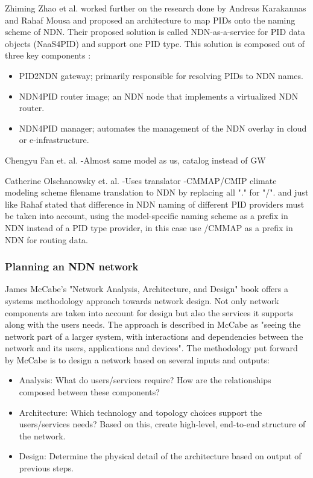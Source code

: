 Zhiming Zhao et al. worked further on the research done by Andreas Karakannas and Rahaf Mousa and proposed an architecture to map PIDs onto the naming scheme of NDN. Their proposed solution is called NDN-as-a-service for PID data objects (NaaS4PID) and support one PID type. This solution is composed out of three key components \cite{icn-resteam}:
\begin{itemize}
  \item PID2NDN gateway; primarily responsible for resolving PIDs to NDN names.
  \item NDN4PID router image; an NDN node that implements a virtualized NDN router.
  \item NDN4PID manager; automates the management of the NDN overlay in cloud or e-infrastructure.
\end{itemize}

Chengyu Fan et. al.
-Almost same model as us, catalog instead of GW

Catherine Olschanowsky et. al. 
-Uses translator
-CMMAP/CMIP climate modeling scheme filename translation to NDN by replacing all "." for "/". and just like Rahaf stated that difference in NDN naming of different PID providers must be taken into account, using the model-specific naming scheme as a prefix in NDN instead of a PID type provider, in this case use /CMMAP as a prefix in NDN for routing data.   



\subsubsection{Planning an NDN network}
James McCabe's "Network Analysis, Architecture, and Design" \cite{mccabe2010network} book offers a systems methodology approach towards network design. Not only network components are taken into account for design but also the services it supports along with the users needs. The approach is described in McCabe as "seeing the network part of a larger system, with interactions and dependencies between the network and its users, applications and devices". The methodology put forward by McCabe is to design a network based on several inputs and outputs:
\begin{itemize}
    \item Analysis: What do users/services require? How are the relationships composed between these components?
    \item Architecture: Which technology and topology choices support the users/services needs? Based on this, create high-level, end-to-end structure of the network.
    \item Design: Determine the physical detail of the architecture based on output of previous steps.
\end{itemize}

